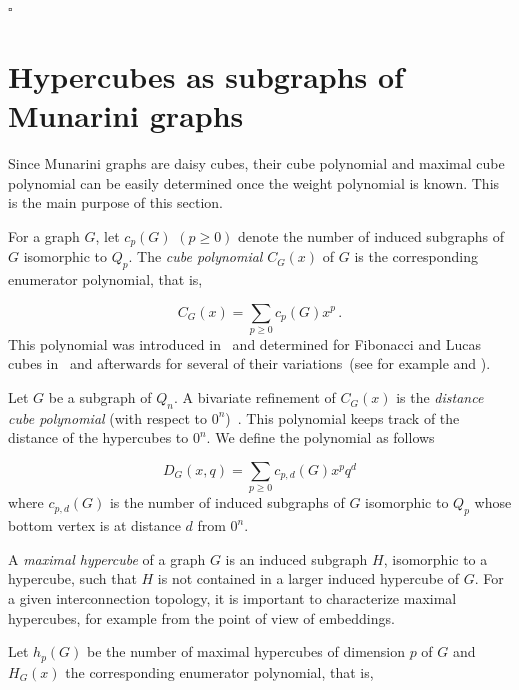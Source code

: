 \documentclass[11pt]{article}
\newcommand{\qed}{\hfill $\square$ \bigskip}
\begin{document}
\qed



 

\section{{Hypercubes as subgraphs of Munarini graphs}}
\label{sec:cub}

Since Munarini graphs are daisy cubes, their cube polynomial and maximal cube polynomial can be easily determined once the weight polynomial is known. This is the main purpose of this section.

For a graph $G$, let $c_p(G)$ $(p\ge 0)$ denote the number of induced 
subgraphs of $G$ isomorphic to  $Q_p$. The {\em cube polynomial} $C_G(x)$
of $G$  is the corresponding enumerator polynomial, that is,

\begin{equation}\label{eqn:defCG}
C_G(x) = \sum_{p\geq 0} c_p(G) x^p\,.
\end{equation}
This polynomial was introduced in~\cite{BKS-2003} and determined for Fibonacci and Lucas cubes in~\cite{KM-2012a} and afterwards for several of their variations~(see \cite[Chapter~9]{EKM-2023} for example and \cite{M-2025b}). 

Let $G$ be a subgraph of $Q_n$. A bivariate refinement of $C_{G}(x)$ is the {\em distance cube polynomial} (with respect to $0^n$)~\cite{KM-2019a}. This polynomial keeps track of the distance of the hypercubes to $0^n$.  We define the polynomial as follows

\begin{equation}\label{eqn:defCGq}
D_G(x,q) = \sum_{p\geq 0} c_{p,d}(G) x^pq^d 
\end{equation} where $c_{p,d}(G)$ is  the number of induced 
subgraphs of $G$ isomorphic to $Q_p$ whose bottom vertex is at distance $d$ from $0^n$.

A {\em maximal hypercube}  of a graph $G$ is an induced subgraph $H$, isomorphic to a hypercube, such that $H$ is not contained in a larger induced hypercube of $G$. For a given interconnection topology, it is important to characterize maximal hypercubes, for example from the point of view of embeddings.

Let $h_p(G)$ be the number of maximal hypercubes of dimension $p$ of $G$ and $H_{G}(x)$ the corresponding 
enumerator polynomial, that is, 
\end{document}
